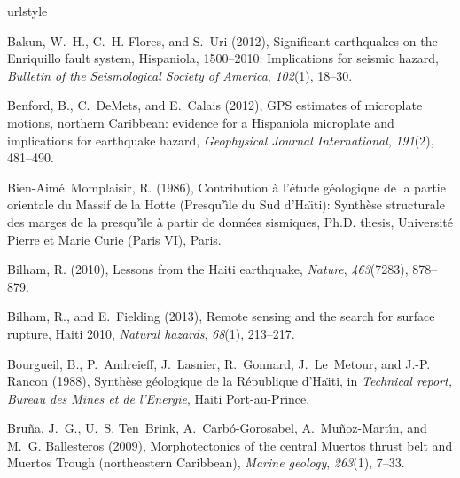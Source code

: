 \documentclass[linenumbers,draft]{agujournal}
\begin{document}
\begin{thebibliography}{65}
\providecommand{\natexlab}[1]{#1}
\expandafter\ifx\csname urlstyle\endcsname\relax
  \providecommand{\doi}[1]{doi:\discretionary{}{}{}#1}\else
  \providecommand{\doi}{doi:\discretionary{}{}{}\begingroup
  \urlstyle{rm}\Url}\fi

Bakun, W.~H., C.~H. Flores, and S.~Uri (2012), Significant earthquakes on the
  {Enriquillo fault system, Hispaniola, 1500--2010: Implications} for seismic
  hazard, \textit{Bulletin of the Seismological Society of America},
  \textit{102}(1), 18--30.

Benford, B., C.~DeMets, and E.~Calais (2012), {GPS} estimates of microplate
  motions, northern {Caribbean}: {evidence for a Hispaniola microplate and
  implications for earthquake hazard}, \textit{Geophysical Journal
  International}, \textit{191}(2), 481--490.

Bien-Aim{\'e}~Momplaisir, R. (1986), Contribution {\`a} {l'}{\'e}tude
  g{\'e}ologique de la partie orientale du {Massif de la Hotte
  (Presqu}'{\^\i}le du {Sud d'Ha}{\"\i}ti): {Synth}{\`e}se structurale des
  marges de la presqu'{\^\i}le {\`a} partir de donn{\'e}es sismiques, Ph.D.
  thesis, Universit{\'e} Pierre et Marie Curie (Paris VI), Paris.

Bilham, R. (2010), {Lessons from the Haiti earthquake}, \textit{Nature},
  \textit{463}(7283), 878--879.

Bilham, R., and E.~Fielding (2013), {Remote sensing and the search for surface
  rupture, Haiti 2010}, \textit{Natural hazards}, \textit{68}(1), 213--217.

Bourgueil, B., P.~Andreieff, J.~Lasnier, R.~Gonnard, J.~Le~Metour, and J.-P.
  Rancon (1988), {Synth{\`e}se g{\'e}ologique de la R{\'e}publique
  d'Ha{\"\i}ti}, in \textit{Technical report, Bureau des Mines et de
  l'Energie}, Haiti Port-au-Prince.

Bru{\~n}a, J.~G., U.~S. Ten~Brink, A.~Carb{\'o}-Gorosabel,
  A.~Mu{\~n}oz-Mart{\'\i}n, and M.~G. Ballesteros (2009), {Morphotectonics of
  the central Muertos thrust belt and Muertos Trough (northeastern Caribbean)},
  \textit{Marine geology}, \textit{263}(1), 7--33.


\end{thebibliography}
\end{document}
